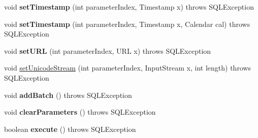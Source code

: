 \begin{DoxyCompactItemize}
\item 
\mbox{\label{classcom_1_1mysql_1_1cj_1_1jdbc_1_1_prepared_statement_wrapper_a5a1ef11d128f571e85f1387f960734d1}} 
void {\bfseries set\+Timestamp} (int parameter\+Index, Timestamp x)  throws S\+Q\+L\+Exception 
\item 
\mbox{\label{classcom_1_1mysql_1_1cj_1_1jdbc_1_1_prepared_statement_wrapper_ab77a99d6d1ca90d7322b0d06ed3ecbc2}} 
void {\bfseries set\+Timestamp} (int parameter\+Index, Timestamp x, Calendar cal)  throws S\+Q\+L\+Exception 
\item 
\mbox{\label{classcom_1_1mysql_1_1cj_1_1jdbc_1_1_prepared_statement_wrapper_a9c7bef05999b36c47458a609ffd48087}} 
void {\bfseries set\+U\+RL} (int parameter\+Index, U\+RL x)  throws S\+Q\+L\+Exception 
\item 
void \mbox{\hyperlink{classcom_1_1mysql_1_1cj_1_1jdbc_1_1_prepared_statement_wrapper_a6a935f5287914ce0489af2ca2118dbdc}{set\+Unicode\+Stream}} (int parameter\+Index, Input\+Stream x, int length)  throws S\+Q\+L\+Exception 
\item 
\mbox{\label{classcom_1_1mysql_1_1cj_1_1jdbc_1_1_prepared_statement_wrapper_a489375b6557464827371090ab0f7f34d}} 
void {\bfseries add\+Batch} ()  throws S\+Q\+L\+Exception 
\item 
\mbox{\label{classcom_1_1mysql_1_1cj_1_1jdbc_1_1_prepared_statement_wrapper_ae5a5f617a6b314ac5e53d703a9f44b5e}} 
void {\bfseries clear\+Parameters} ()  throws S\+Q\+L\+Exception 
\item 
\mbox{\label{classcom_1_1mysql_1_1cj_1_1jdbc_1_1_prepared_statement_wrapper_a2e2560120c1aa47c46bec73c634c7654}} 
boolean {\bfseries execute} ()  throws S\+Q\+L\+Exception 
\item 
\mbox{\label{classcom_1_1mysql_1_1cj_1_1jdbc_1_1_prepared_statement_wrapper_ad8112a106cb0b21284bd0a3db7ad1699}} 

\end{DoxyCompactItemize}
